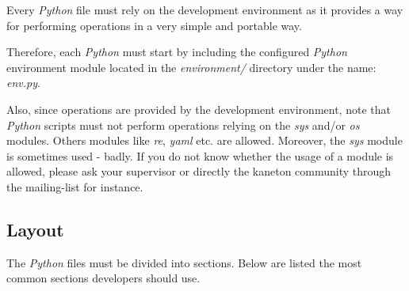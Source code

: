 Every \textit{Python} file must rely on the development environment as it
provides a way for performing operations in a very simple and portable way.

Therefore, each \textit{Python} must start by including the configured
\textit{Python} environment module located in the \textit{environment/}
directory under the name: \textit{env.py}.

Also, since operations are provided by the development environment, note
that \textit{Python} scripts must not perform operations relying on the
\textit{sys} and/or \textit{os} modules. Others modules like \textit{re},
\textit{yaml} etc. are allowed. Moreover, the \textit{sys} module is
sometimes used - badly. If you do not know whether the usage of a module
is allowed, please ask your supervisor or directly the kaneton community
through the mailing-list for instance.

%
%

\subsection{Layout}

The \textit{Python} files must be divided into sections. Below are listed
the most common sections developers should use.

